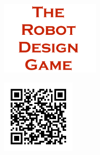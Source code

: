 \documentclass[11pt]{article}
\begin{document}
            
	
	\begin{center}
		\vfill
		\vfill
		\vfill

		\includegraphics[height=3.6cm]{rdg_logo}%
		
		\vfill

		\includegraphics[height=3.6cm]{comm_tether-qr}%

		\vfill
	\end{center}
\end{document}
